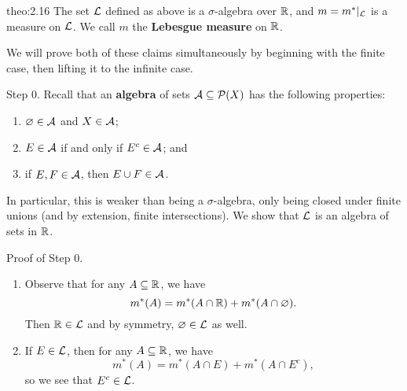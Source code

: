 \begin{theo}[Carathéodory]{theo:2.16}
    The set ${\cal L}$ defined as above is a $\sigma$-algebra over $\mathbb{R}$, 
    and $m = m^*|_{\cal L}$ is a measure on ${\cal L}$. We call 
    $m$ the {\bf Lebesgue measure} on $\mathbb{R}$. 
\end{theo}
\begin{pf}
    We will prove both of these claims simultaneously by beginning with 
    the finite case, then lifting it to the infinite case.

    {\sc Step 0.} Recall that an {\bf algebra} of sets ${\cal A} 
    \subseteq {\cal P}(X)$ has the following properties: 
    \begin{enumerate}[(1)]
        \item $\varnothing \in {\cal A}$ and $X \in {\cal A}$;
        \item $E \in {\cal A}$ if and only if $E^c \in {\cal A}$; and 
        \item if $E, F \in {\cal A}$, then $E \cup F \in {\cal A}$.
    \end{enumerate}
    In particular, this is weaker than being a $\sigma$-algebra, 
    only being closed under finite unions (and by extension, finite 
    intersections). We show that ${\cal L}$ is an algebra of sets in $\mathbb{R}$.

    {\sc Proof of Step 0.}~
    \begin{enumerate}[(1)]

        \item Observe that for any $A \subseteq \mathbb{R}$, we have 
        \[ m^*(A) = m^*(A \cap \mathbb{R}) + m^*(A \cap \varnothing). \] 
        Then $\mathbb{R} \in {\cal L}$ and by symmetry, $\varnothing \in {\cal L}$ 
        as well.

        \item If $E \in {\cal L}$, then for any $A \subseteq \mathbb{R}$, we have
        \[ m^*(A) = m^*(A \cap E) + m^*(A \cap E^c), \] 
        so we see that $E^c \in {\cal L}$. 


\end{enumerate}
\end{pf}
